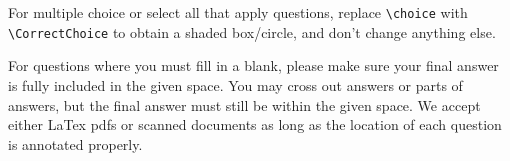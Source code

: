 \documentclass[11pt,addpoints,answers]{exam}
\numberwithin{equation}{section} %
\numberwithin{figure}{section} %
\numberwithin{table}{section} %
\begin{document}
For multiple choice or select all that apply questions, replace \lstinline{\choice} with \lstinline{\CorrectChoice} to obtain a shaded box/circle, and don't change anything else.


For questions where you must fill in a blank, please make sure your final answer is fully included in the given space. You may cross out answers or parts of answers, but the final answer must still be within the given space. We accept either LaTex pdfs or scanned documents as long as the location of each question is annotated properly.


\clearpage

\end{document}
